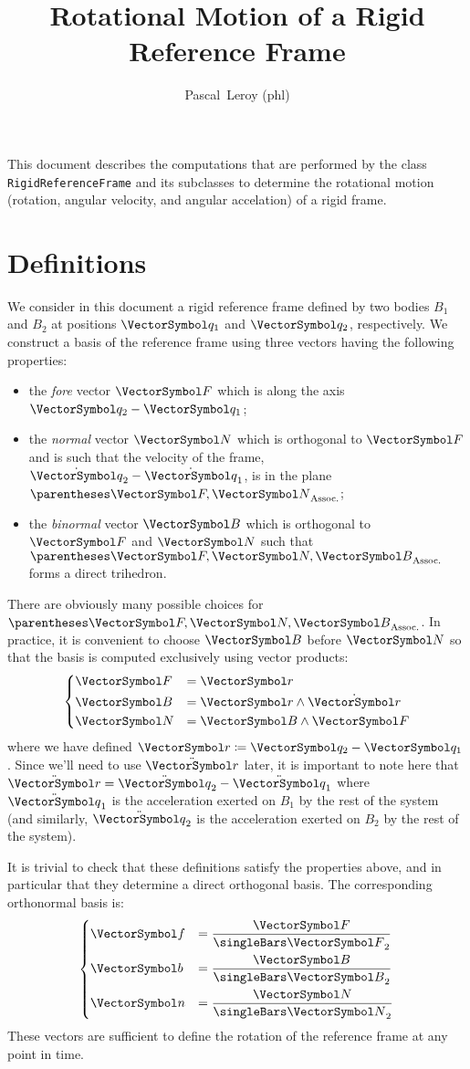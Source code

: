 \documentclass[10pt, a4paper, twoside]{basestyle}
\title{Rotational Motion of a Rigid Reference Frame}
\date{\printdate{2023-04-26}}
\author{Pascal~Leroy (phl)}
\begin{document}
\maketitle
\begin{sloppypar}
\noindent
This document describes the computations that are performed by the class \texttt{RigidReferenceFrame} and its subclasses to determine the rotational motion (rotation,
angular velocity, and angular accelation) of a rigid frame.
\end{sloppypar}

\section*{Definitions}
We consider in this document a rigid reference frame defined by two bodies $B_1$ and $B_2$ at positions $\vq_1$ and $\vq_2$, respectively.  We construct a basis of the reference frame using three vectors having the following properties:
\begin{itemize}
\item{the \emph{fore} vector $\vF$ which is along the axis $\vq_2 - \vq_1$;}
\item{the \emph{normal} vector $\vN$ which is orthogonal to $\vF$ and is such that the velocity of the frame, $\dot{\vq}_2 - \dot{\vq}_1$, is in the plane $\pa{\vF, \vN}$;}
\item{the \emph{binormal} vector $\vB$ which is orthogonal to $\vF$ and $\vN$ such that $\pa{\vF, \vN, \vB}$ forms a direct trihedron.}
\end{itemize}
There are obviously many possible choices for $\pa{\vF, \vN, \vB}$.  In practice, it is convenient to choose $\vB$ before $\vN$ so that the basis is computed exclusively using vector products:
\begin{equation}
\begin{dcases}
\vF &= \vr \\
\vB &= \vr \wedge \dot{\vr} \\
\vN &= \vB \wedge \vF
\end{dcases}
\label{eqnFBN}
\end{equation}
where we have defined $\vr \DefineAs \vq_2 - \vq_1$.  Since we'll need to use $\ddot{\vr}$ later, it is important to note here that $\ddot{\vr} = \ddot{\vq}_2 - \ddot{\vq}_1$ where $\ddot{\vq}_1$ is the acceleration exerted on $B_1$ by the rest of the system (and similarly, $\ddot{\vq}_2$ is the acceleration exerted on $B_2$ by the rest of the system).

It is trivial to check that these definitions satisfy the properties above, and in particular that they determine a direct orthogonal basis.  The corresponding orthonormal basis is:
\begin{equation}
\begin{dcases}
\vf &= \frac{\vF}{\norm\vF} \\
\vb &= \frac{\vB}{\norm\vB} \\
\vn &= \frac{\vN}{\norm\vN}
\end{dcases}
\label{eqnfbn}
\end{equation}
These vectors are sufficient to define the rotation of the reference frame at any point in time.
\end{document}
